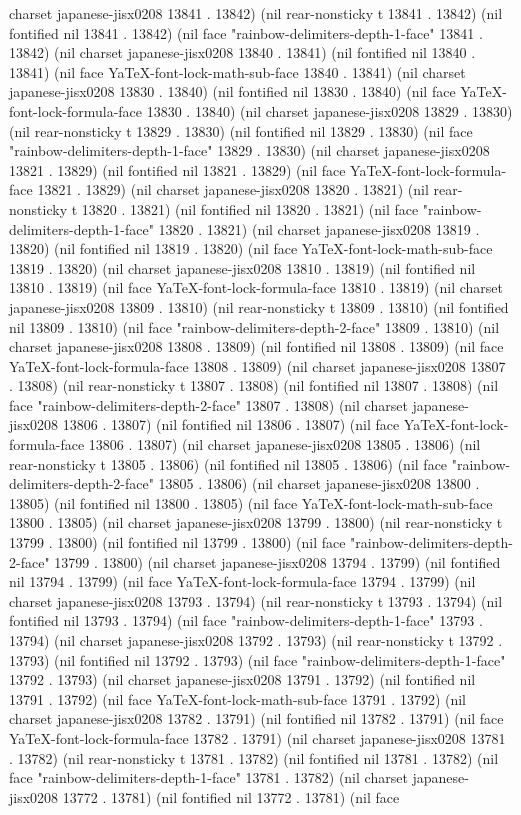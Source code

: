 charset japanese-jisx0208 13841 . 13842) (nil rear-nonsticky t 13841 . 13842) (nil fontified nil 13841 . 13842) (nil face "rainbow-delimiters-depth-1-face" 13841 . 13842) (nil charset japanese-jisx0208 13840 . 13841) (nil fontified nil 13840 . 13841) (nil face YaTeX-font-lock-math-sub-face 13840 . 13841) (nil charset japanese-jisx0208 13830 . 13840) (nil fontified nil 13830 . 13840) (nil face YaTeX-font-lock-formula-face 13830 . 13840) (nil charset japanese-jisx0208 13829 . 13830) (nil rear-nonsticky t 13829 . 13830) (nil fontified nil 13829 . 13830) (nil face "rainbow-delimiters-depth-1-face" 13829 . 13830) (nil charset japanese-jisx0208 13821 . 13829) (nil fontified nil 13821 . 13829) (nil face YaTeX-font-lock-formula-face 13821 . 13829) (nil charset japanese-jisx0208 13820 . 13821) (nil rear-nonsticky t 13820 . 13821) (nil fontified nil 13820 . 13821) (nil face "rainbow-delimiters-depth-1-face" 13820 . 13821) (nil charset japanese-jisx0208 13819 . 13820) (nil fontified nil 13819 . 13820) (nil face YaTeX-font-lock-math-sub-face 13819 . 13820) (nil charset japanese-jisx0208 13810 . 13819) (nil fontified nil 13810 . 13819) (nil face YaTeX-font-lock-formula-face 13810 . 13819) (nil charset japanese-jisx0208 13809 . 13810) (nil rear-nonsticky t 13809 . 13810) (nil fontified nil 13809 . 13810) (nil face "rainbow-delimiters-depth-2-face" 13809 . 13810) (nil charset japanese-jisx0208 13808 . 13809) (nil fontified nil 13808 . 13809) (nil face YaTeX-font-lock-formula-face 13808 . 13809) (nil charset japanese-jisx0208 13807 . 13808) (nil rear-nonsticky t 13807 . 13808) (nil fontified nil 13807 . 13808) (nil face "rainbow-delimiters-depth-2-face" 13807 . 13808) (nil charset japanese-jisx0208 13806 . 13807) (nil fontified nil 13806 . 13807) (nil face YaTeX-font-lock-formula-face 13806 . 13807) (nil charset japanese-jisx0208 13805 . 13806) (nil rear-nonsticky t 13805 . 13806) (nil fontified nil 13805 . 13806) (nil face "rainbow-delimiters-depth-2-face" 13805 . 13806) (nil charset japanese-jisx0208 13800 . 13805) (nil fontified nil 13800 . 13805) (nil face YaTeX-font-lock-math-sub-face 13800 . 13805) (nil charset japanese-jisx0208 13799 . 13800) (nil rear-nonsticky t 13799 . 13800) (nil fontified nil 13799 . 13800) (nil face "rainbow-delimiters-depth-2-face" 13799 . 13800) (nil charset japanese-jisx0208 13794 . 13799) (nil fontified nil 13794 . 13799) (nil face YaTeX-font-lock-formula-face 13794 . 13799) (nil charset japanese-jisx0208 13793 . 13794) (nil rear-nonsticky t 13793 . 13794) (nil fontified nil 13793 . 13794) (nil face "rainbow-delimiters-depth-1-face" 13793 . 13794) (nil charset japanese-jisx0208 13792 . 13793) (nil rear-nonsticky t 13792 . 13793) (nil fontified nil 13792 . 13793) (nil face "rainbow-delimiters-depth-1-face" 13792 . 13793) (nil charset japanese-jisx0208 13791 . 13792) (nil fontified nil 13791 . 13792) (nil face YaTeX-font-lock-math-sub-face 13791 . 13792) (nil charset japanese-jisx0208 13782 . 13791) (nil fontified nil 13782 . 13791) (nil face YaTeX-font-lock-formula-face 13782 . 13791) (nil charset japanese-jisx0208 13781 . 13782) (nil rear-nonsticky t 13781 . 13782) (nil fontified nil 13781 . 13782) (nil face "rainbow-delimiters-depth-1-face" 13781 . 13782) (nil charset japanese-jisx0208 13772 . 13781) (nil fontified nil 13772 . 13781) (nil face 